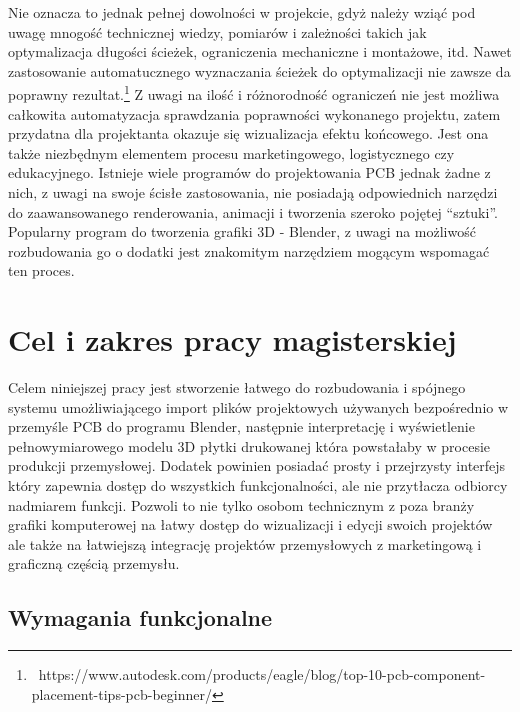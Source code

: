 \documentclass[brudnopis]{xmgr}
\begin{document}
Nie oznacza to jednak pełnej dowolności w projekcie, gdyż należy wziąć pod uwagę mnogość technicznej wiedzy, pomiarów i zależności takich jak optymalizacja długości ścieżek, ograniczenia mechaniczne i montażowe, itd. Nawet zastosowanie automatucznego wyznaczania ścieżek do optymalizacji nie zawsze da poprawny rezultat.\footnote{~https://www.autodesk.com/products/eagle/blog/top-10-pcb-component-placement-tips-pcb-beginner/} Z uwagi na ilość i różnorodność ograniczeń nie jest możliwa całkowita automatyzacja sprawdzania poprawności wykonanego projektu, zatem przydatna dla projektanta okazuje się wizualizacja efektu końcowego. Jest ona także niezbędnym elementem procesu marketingowego, logistycznego czy edukacyjnego. Istnieje wiele programów do projektowania PCB jednak żadne z nich, z uwagi na swoje ścisłe zastosowania, nie posiadają odpowiednich narzędzi do zaawansowanego renderowania, animacji i tworzenia szeroko pojętej “sztuki”. Popularny program do tworzenia grafiki 3D - Blender, z uwagi na możliwość rozbudowania go o dodatki jest znakomitym narzędziem mogącym wspomagać ten proces.




\chapter{Cel i zakres pracy magisterskiej}

Celem niniejszej pracy jest stworzenie łatwego do rozbudowania i spójnego systemu umożliwiającego import plików projektowych używanych bezpośrednio w przemyśle PCB do programu Blender, następnie interpretację i wyświetlenie pełnowymiarowego modelu 3D płytki drukowanej która powstałaby w procesie produkcji przemysłowej. Dodatek powinien posiadać prosty i przejrzysty interfejs który zapewnia dostęp do wszystkich funkcjonalności, ale nie przytłacza odbiorcy nadmiarem funkcji. Pozwoli to nie tylko osobom technicznym z poza branży grafiki komputerowej na łatwy dostęp do wizualizacji i edycji swoich projektów ale także na łatwiejszą integrację projektów przemysłowych z marketingową i graficzną częścią przemysłu.

\section{Wymagania funkcjonalne}
\end{document}
